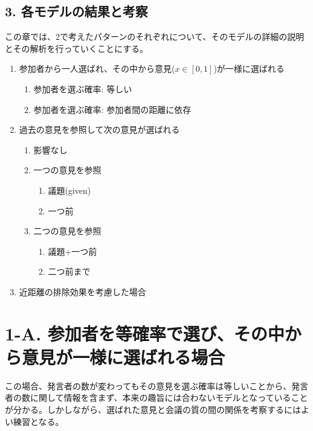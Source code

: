 \documentclass[letterpaper,10pt,english]{sphinxmanual}
\begin{document}
\subsection{3. 各モデルの結果と考察}
\label{draft:id5}
この章では、2で考えたパターンのそれぞれについて、そのモデルの詳細の説明とその解析を行っていくことにする。
\begin{enumerate}
\item {} 
参加者から一人選ばれ、その中から意見(\(x\in [0, 1]\))が一様に選ばれる
\begin{enumerate}
\item {} 
参加者を選ぶ確率: 等しい

\item {} 
参加者を選ぶ確率: 参加者間の距離に依存

\end{enumerate}

\item {} 
過去の意見を参照して次の意見が選ばれる
\begin{enumerate}
\item {} 
影響なし

\item {} 
一つの意見を参照
\begin{enumerate}
\item {} 
議題(given)

\item {} 
一つ前

\end{enumerate}

\item {} 
二つの意見を参照
\begin{enumerate}
\item {} 
議題+一つ前

\item {} 
二つ前まで

\end{enumerate}

\end{enumerate}

\item {} 
近距離の排除効果を考慮した場合

\end{enumerate}


\section{1-A. 参加者を等確率で選び、その中から意見が一様に選ばれる場合}
\label{draft:a}
この場合、発言者の数が変わってもその意見を選ぶ確率は等しいことから、発言者の数に関して情報を含まず、本来の趣旨には合わないモデルとなっていることが分かる。しかしながら、選ばれた意見と会議の質の間の関係を考察するにはよい練習となる。
\end{document}
